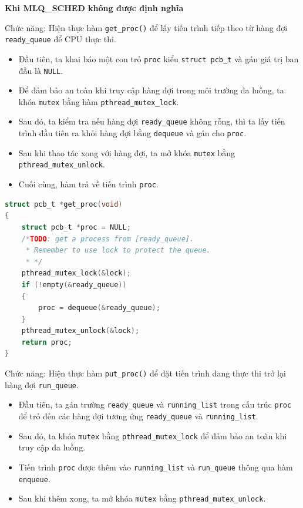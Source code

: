 \textbf{Khi MLQ\_SCHED không được định nghĩa}

Chức năng: Hiện thực hàm \texttt{get\_proc()} để lấy tiến trình tiếp theo từ hàng đợi \texttt{ready\_queue} để CPU thực thi.

\begin{itemize}
    \item Đầu tiên, ta khai báo một con trỏ \texttt{proc} kiểu \texttt{struct pcb\_t} và gán giá trị ban đầu là \texttt{NULL}.
    \item Để đảm bảo an toàn khi truy cập hàng đợi trong môi trường đa luồng, ta khóa \texttt{mutex} bằng hàm \texttt{pthread\_mutex\_lock}.
    \item Sau đó, ta kiểm tra nếu hàng đợi \texttt{ready\_queue} không rỗng, thì ta lấy tiến trình đầu tiên ra khỏi hàng đợi bằng \texttt{dequeue} và gán cho \texttt{proc}.
    \item Sau khi thao tác xong với hàng đợi, ta mở khóa \texttt{mutex} bằng \texttt{pthread\_mutex\_unlock}.
    \item Cuối cùng, hàm trả về tiến trình \texttt{proc}.
\end{itemize}

\begin{lstlisting}[style=Cstyle,language=C]
struct pcb_t *get_proc(void)
{
    struct pcb_t *proc = NULL;
    /*TODO: get a process from [ready_queue].
     * Remember to use lock to protect the queue.
     * */
    pthread_mutex_lock(&lock);
    if (!empty(&ready_queue))
    {
        proc = dequeue(&ready_queue);
    }
    pthread_mutex_unlock(&lock);
    return proc;
}
\end{lstlisting}



Chức năng: Hiện thực hàm \texttt{put\_proc()} để đặt tiến trình đang thực thi trở lại hàng đợi \texttt{run\_queue}.

\begin{itemize}
    \item Đầu tiên, ta gán trường \texttt{ready\_queue} và \texttt{running\_list} trong cấu trúc \texttt{proc} để trỏ đến các hàng đợi tương ứng \texttt{ready\_queue} và \texttt{running\_list}.
    \item Sau đó, ta khóa \texttt{mutex} bằng \texttt{pthread\_mutex\_lock} để đảm bảo an toàn khi truy cập đa luồng.
    \item Tiến trình \texttt{proc} được thêm vào \texttt{running\_list} và \texttt{run\_queue} thông qua hàm \texttt{enqueue}.
    \item Sau khi thêm xong, ta mở khóa \texttt{mutex} bằng \texttt{pthread\_mutex\_unlock}.
\end{itemize}

